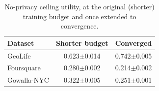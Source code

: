\begin{table}[t]
\centering
\caption{No-privacy ceiling utility, at the original (shorter) training budget and once extended to convergence.}
\label{tab:no-privacy-ceiling}
\footnotesize
\begin{tabular}{@{}lcc@{}}
\toprule
Dataset & Shorter budget & Converged \\
\midrule
GeoLife & 0.623$\pm$0.014 & 0.742$\pm$0.005 \\
Foursquare & 0.280$\pm$0.002 & 0.214$\pm$0.002 \\
Gowalla-NYC & 0.322$\pm$0.005 & 0.251$\pm$0.001 \\
\bottomrule
\end{tabular}
\end{table}
